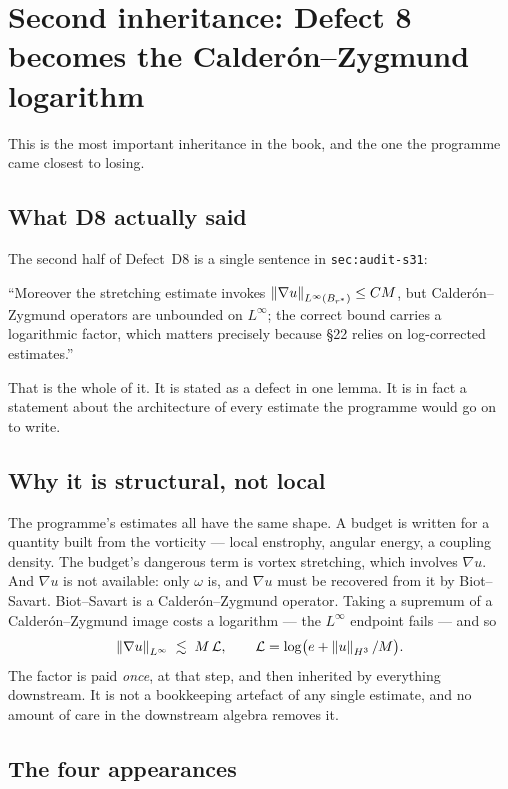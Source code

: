 \section{Second inheritance: Defect 8 becomes the Calder\'on--Zygmund
logarithm}
\label{sec:cz-inheritance}

This is the most important inheritance in the book, and the one the programme
came closest to losing.

\subsection{What D8 actually said}

The second half of Defect~D8 is a single sentence in
\texttt{sec:audit-s31}:

\begin{record}
``Moreover the stretching estimate invokes
\(\left\|\nabla u\right\|_{L^\infty(B_{r^{*}})}\le CM\), but Calder\'on--Zygmund
operators are unbounded on \(L^\infty\); the correct bound carries a
logarithmic factor, which matters precisely because \S22 relies on
log-corrected estimates.''
\end{record}

That is the whole of it. It is stated as a defect in one lemma. It is in fact
a statement about the architecture of every estimate the programme would go on
to write.

\subsection{Why it is structural, not local}

The programme's estimates all have the same shape. A budget is written for a
quantity built from the vorticity --- local enstrophy, angular energy, a
coupling density. The budget's dangerous term is vortex stretching, which
involves \(\nabla u\). And \(\nabla u\) is not available: only \(\omega\) is,
and \(\nabla u\) must be recovered from it by Biot--Savart. Biot--Savart is a
Calder\'on--Zygmund operator. Taking a supremum of a Calder\'on--Zygmund image
costs a logarithm --- the \(L^\infty\) endpoint fails --- and so
\[
  \left\|\nabla u\right\|_{L^\infty} \;\lesssim\; M\,\mathcal{L},
  \qquad \mathcal{L} = \log\bigl(e+\left\|u\right\|_{H^3}/M\bigr).
\]
The factor is paid \emph{once}, at that step, and then inherited by everything
downstream. It is not a bookkeeping artefact of any single estimate, and no
amount of care in the downstream algebra removes it.

\subsection{The four appearances}

